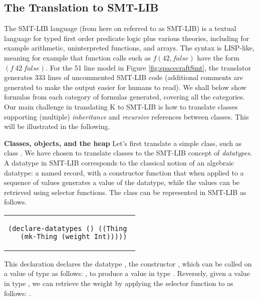 \subsection{The Translation to SMT-LIB}

The SMT-LIB language (from here on referred to as SMT-LIB) is a textual
language for typed first order predicate logic plus various theories,
including for example arithmetic, uninterpreted functions, and
arrays. The syntax is LISP-like, meaning for example that function
calls such as $f(42,false)$ have the form $(f\ 42\ false)$. For the 51
line \Klang{} model in Figure \ref{fig:spacecraftSmt}, the translator
generates 333 lines of uncommented SMT-LIB code (additional comments
are generated to make the output easier for humans to read). We shall
below show formulas from each category of formulas generated,
covering all the categories. Our main
challenge in translating K to SMT-LIB is how to translate classes
supporting (multiple) {\em inheritance} and {\em recursive} references
between classes. This will be illustrated in the following.

\textbf{Classes, objects, and the heap} Let's first translate a simple
class, such as class .  We have chosen to translate
classes to the SMT-LIB concept of {\em datatypes}. A datatype in
SMT-LIB corresponds to the classical notion of an algebraic datatype:
a named record, with a constructor function that when applied to a
sequence of values generates a value of the datatype, while the values
can be retrieved using selector functions.  The class 
can be represented in SMT-LIB as follows.

\lstset{language=SMT,numbers=none}

\begin{center}
\begin{tabular}{c}
\small
\begin{lstlisting}
(declare-datatypes () ((Thing 
  (mk-Thing (weight Int)))))
\end{lstlisting}
\end{tabular}
\end{center}

\noindent This declaration declares the datatype , the
constructor , which can be called on a value 
of type  as follows: , to produce a
value in type . Reversely, given a value  in type
, we can retrieve the weight by applying the selector
function  to  as follows: .

